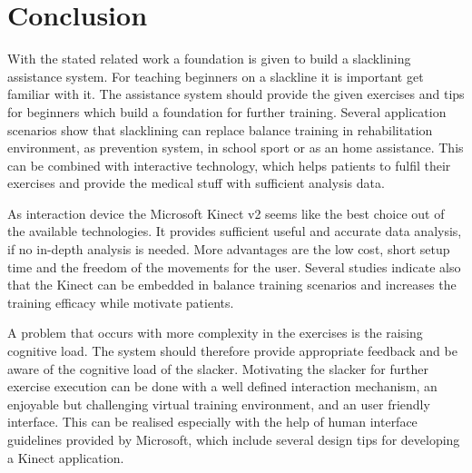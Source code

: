\section{Conclusion}
With the stated related work a foundation is given to build a slacklining assistance system. For teaching beginners on a slackline it is important get familiar with it. The assistance system should provide the given exercises and tips for beginners which build a foundation for further training.
Several application scenarios show that slacklining can replace balance training in rehabilitation environment, as prevention system, in school sport or as an home assistance. This can be combined with interactive technology, which helps patients to fulfil their exercises and provide the medical stuff with sufficient analysis data.

As interaction device the Microsoft Kinect v2 seems like the best choice out of the available technologies. It provides sufficient useful and accurate data analysis, if no in-depth analysis is needed. More advantages are the low cost, short setup time and the freedom of the movements for the user. Several studies indicate also that the Kinect can be embedded in balance training scenarios and increases the training efficacy while motivate patients.

A problem that occurs with more complexity in the exercises is the raising cognitive load. The system should therefore provide appropriate feedback and be aware of the cognitive load of the slacker. Motivating the slacker for further exercise execution can be done with a well defined interaction mechanism, an enjoyable but challenging virtual training environment, and an user friendly interface. This can be realised especially with the help of human interface guidelines provided by Microsoft, which include several design tips for developing a Kinect application.
